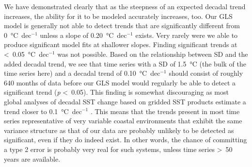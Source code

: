 \documentclass[]{ametsoc}
\begin{document}
We have demonstrated clearly that as the steepness of an expected decadal trend increases, the ability for it to be modeled accurately increases, too. Our GLS model is generally not able to detect trends that are significantly different from \SI{0}{\degreeCelsius}~dec$^{-1}$ unless a slope of \SI{0.20}{\degreeCelsius}~dec$^{-1}$ exists. Very rarely were we able to produce significant model fits at shallower slopes. Finding significant trends at \textless~\SI{0.05}{\degreeCelsius}~dec$^{-1}$ was not possible. Based on the relationship between SD and the added decadal trend, we see that time series with a SD of \SI{1.5}{\degreeCelsius} (the bulk of the time series here) and a decadal trend of \SI{0.10}{\degreeCelsius}~dec$^{-1}$ should consist of roughly 640 months of data before our GLS model would regularly be able to detect a significant trend (\emph{p} \textless~0.05). This finding is somewhat discouraging as most global analyses of decadal SST change based on gridded SST products estimate a trend closer to \SI{0.1}{\degreeCelsius}~dec$^{-1}$ \citep[\emph{e.g.}][]{IPCC2013}. This means that the trends present in most time series representative of very variable coastal environments that exhibit the same variance structure as that of our data are probably unlikely to be detected as significant, even if they do indeed exist. In other words, the chance of committing a type 2 error is probably very real for such systems, unless time series \textgreater~50 years are available.
\end{document}
